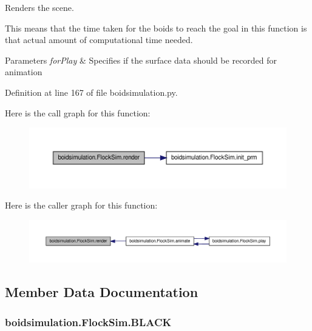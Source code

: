 Renders the scene. 

This means that the time taken for the boids to reach the goal in this function is that actual amount of computational time needed. 
\begin{DoxyParams}{Parameters}
{\em for\-Play} & Specifies if the surface data should be recorded for animation \\
\hline
\end{DoxyParams}


Definition at line 167 of file boidsimulation.\-py.



Here is the call graph for this function\-:\nopagebreak
\begin{figure}[H]
\begin{center}
\leavevmode
\includegraphics[width=350pt]{classboidsimulation_1_1FlockSim_a3c456990ff58b2a5dfae2dd2b5b6d294_cgraph}
\end{center}
\end{figure}




Here is the caller graph for this function\-:\nopagebreak
\begin{figure}[H]
\begin{center}
\leavevmode
\includegraphics[width=350pt]{classboidsimulation_1_1FlockSim_a3c456990ff58b2a5dfae2dd2b5b6d294_icgraph}
\end{center}
\end{figure}




\subsection{Member Data Documentation}
\hypertarget{classboidsimulation_1_1FlockSim_ac9c61aa93f3db94b9a340b8555d90adf}{
\subsubsection[{B\-L\-A\-C\-K}]{\setlength{\rightskip}{0pt plus 5cm}boidsimulation.\-Flock\-Sim.\-B\-L\-A\-C\-K}}\label{classboidsimulation_1_1FlockSim_ac9c61aa93f3db94b9a340b8555d90adf}


